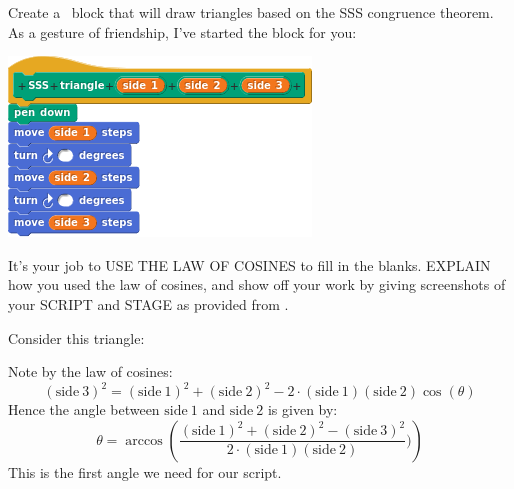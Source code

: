 \documentclass[noauthor,nooutcomes,handout]{ximera}
\begin{document}
\begin{question}
  Create a \snap\ block that will draw triangles based on the SSS
  congruence theorem.  As a gesture of friendship, I've started the
  block for you:
  \begin{center}
    \includegraphics{sssBlockBLANK}
  \end{center}
  It's your job to USE THE LAW OF COSINES to fill in the
  blanks. EXPLAIN how you used the law of cosines, and show off your
  work by giving screenshots of your SCRIPT and STAGE as provided
  from \snap.
  \begin{freeResponse}
    Consider this triangle:
    \begin{center}
      \end{center}


    
    Note by the law of cosines:
    \[
    (\mathrm{side~3})^2 = (\mathrm{side~1})^2 + (\mathrm{side~2})^2 - 2\cdot (\mathrm{side~1})(\mathrm{side~2})\cos(\theta)
    \]
    Hence the angle between $\mathrm{side~1}$ and $\mathrm{side~2}$ is given by:
    \[
    \theta = \arccos\left(\frac{(\mathrm{side~1})^2 + (\mathrm{side~2})^2- (\mathrm{side~3})^2}{2\cdot (\mathrm{side~1})(\mathrm{side~2})})\right) 
    \]
    This is the first angle we need for our script.


\end{freeResponse}
\end{question}
\end{document}
